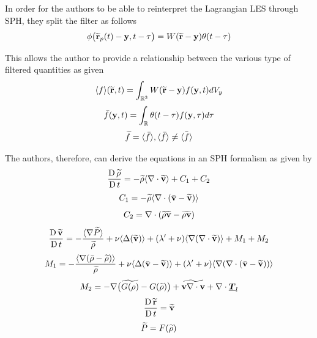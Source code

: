 In order for the authors to be able to reinterpret the Lagrangian LES through SPH, they split the filter as follows
\begin{equation}
    \phi\big(\widetilde{\mathbf{r}}_p(t)-\mathbf{y}, t-\tau  \big) = W(\widetilde{\mathbf{r}} - \mathbf{y})\theta(t-\tau)
\end{equation}

This allows the author to provide a relationship between the various type of filtered quantities as given
\begin{equation}
    \langle f \rangle(\widetilde{\mathbf{r}}, t) = \int_{\mathbb{R}^3} W ( \widetilde{\mathbf{r}} - \mathbf{y} ) f ( \mathbf{y}, t ) dV_y
\end{equation}
\begin{equation}
    \bar{f}(\mathbf{y}, t) = \int_{\mathbb{R}} \theta(t-\tau) f(\mathbf{y}, \tau) d\tau
\end{equation}
\begin{equation}
    \widetilde{f} = \langle \bar{f} \rangle, \langle \bar{f} \rangle \neq \bar{\langle f \rangle}
\end{equation}

The authors, therefore, can derive the equations in an SPH formalism as given by
\begin{equation}
    \frac{\operatorname{D} \widetilde{\rho}}{\operatorname{D} t} = -\widetilde{\rho} \langle \nabla\cdot\widetilde{\mathbf{v}} \rangle + C_1 + C_2
\end{equation}
\begin{equation}
    C_1 = -\widetilde{\rho}\langle \nabla\cdot(\bar{\mathbf{v}}-\widetilde{\mathbf{v}}) \rangle
\end{equation}
\begin{equation}
    C_2 = \nabla\cdot(\widetilde{\rho}\widetilde{\mathbf{v}} - \widetilde{\rho\mathbf{v}})
\end{equation}
\begin{equation}
    \frac{\operatorname{D} \widetilde{\mathbf{v}}}{\operatorname{D} t} = -\frac{\langle \nabla\widetilde{P} \rangle}{\widetilde{\rho}} + \nu\langle \Delta(\widetilde{\mathbf{v}}) \rangle + (\lambda'+\nu)\langle \nabla(\nabla\cdot\widetilde{\mathbf{v}}) \rangle + M_1 + M_2
\end{equation}
\begin{equation}
    M_1 = -\frac{\langle \nabla(\bar{\rho}-\widetilde{\rho}) \rangle}{\widetilde{\rho}} + \nu\langle \Delta(\bar{\mathbf{v}}-\widetilde{\mathbf{v}}) \rangle + (\lambda'+\nu)\langle \nabla(\nabla\cdot(\bar{\mathbf{v}}-\widetilde{\mathbf{v}})) \rangle
\end{equation}
\begin{equation}
    M_2 = -\nabla\big(\widetilde{G(\rho)}-G(\widetilde{\rho})\big) + \widetilde{\mathbf{v}\nabla\cdot\mathbf{v}} + \nabla\cdot\underline{\bm{T}}_l
\end{equation}
\begin{equation}
    \frac{\operatorname{D} \widetilde{\mathbf{r}}}{\operatorname{D} t} = \widetilde{\mathbf{v}}
\end{equation}
\begin{equation}
    \widetilde{P}=F(\widetilde{\rho})
\end{equation}

